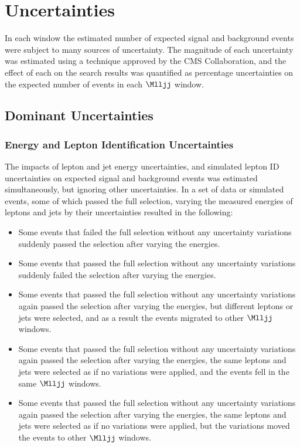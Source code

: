 \section{Uncertainties}
\label{sec:uncertainties}
In each window the estimated number of expected signal and background events were subject to 
many sources of uncertainty.  The magnitude of each uncertainty was estimated using a technique 
approved by the CMS Collaboration, and the effect of each on the search results was quantified 
as percentage uncertainties on the expected number of events in each $\Mlljj$ window.

\subsection{Dominant Uncertainties}
\label{sec:dominantUncs}

\subsubsection{Energy and Lepton Identification Uncertainties}
\label{sec:enrgyLeptIdUncs}
The impacts of lepton and jet energy uncertainties, and simulated lepton ID uncertainties on 
expected signal and background events was estimated simultaneously, but ignoring other 
uncertainties.  In a set of data or simulated events, some of which passed the full selection, 
varying the measured energies of leptons and jets by their uncertainties resulted in the following:

\begin{itemize}
	\item Some events that failed the full selection without any uncertainty variations suddenly passed the 
		selection after varying the energies.
	\item Some events that passed the full selection without any uncertainty variations suddenly failed the 
		selection after varying the energies.
	\item Some events that passed the full selection without any uncertainty variations again passed the 
		selection after varying the energies, but different leptons or jets were selected, and 
		as a result the events migrated to other $\Mlljj$ windows.
	\item Some events that passed the full selection without any uncertainty variations again passed the 
		selection after varying the energies, the same leptons and jets were selected as if no 
		variations were applied, and the events fell in the same $\Mlljj$ windows.
	\item Some events that passed the full selection without any uncertainty variations again passed the 
		selection after varying the energies, the same leptons and jets were selected as if no 
		variations were applied, but the variations moved the events to other $\Mlljj$ windows.
\end{itemize}

